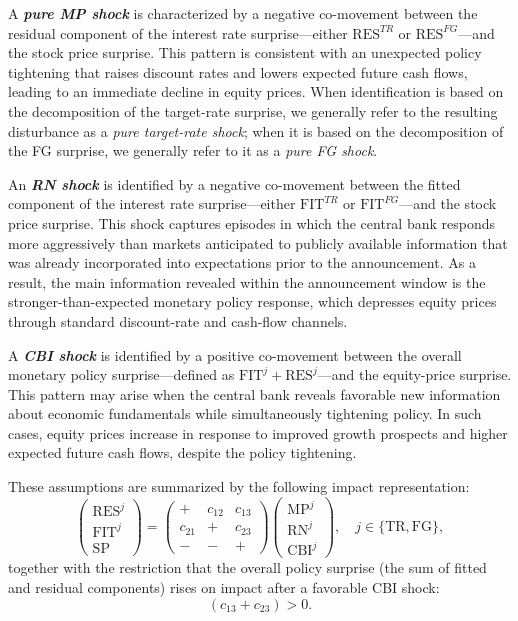 \documentclass[12pt, reqno]{article}
\begin{document}
A \emph{\textbf{pure MP shock}} is characterized by a negative co-movement between the residual component of the interest rate surprise—either $\text{RES}^{TR}$ or $\text{RES}^{FG}$—and the stock price surprise. This pattern is consistent with an unexpected policy tightening that raises discount rates and lowers expected future cash flows, leading to an immediate decline in equity prices. When identification is based on the decomposition of the target-rate surprise, we generally refer to the resulting disturbance as a \emph{pure target-rate shock}; when it is based on the decomposition of the FG surprise, we generally refer to it as a \emph{pure FG shock}.

An \emph{\textbf{RN shock}} is identified by a negative co-movement between the fitted component of the interest rate surprise—either $\text{FIT}^{TR}$ or $\text{FIT}^{FG}$—and the stock price surprise. This shock captures episodes in which the central bank responds more aggressively than markets anticipated to publicly available information that was already incorporated into expectations prior to the announcement. As a result, the main information revealed within the announcement window is the stronger-than-expected monetary policy response, which depresses equity prices through standard discount-rate and cash-flow channels.

A \emph{\textbf{CBI shock}} is identified by a positive co-movement between the overall monetary policy surprise—defined as $\text{FIT}^{j}+\text{RES}^{j}$—and the equity-price surprise. This pattern may arise when the central bank reveals favorable new information about economic fundamentals while simultaneously tightening policy. In such cases, equity prices increase in response to improved growth prospects and higher expected future cash flows, despite the policy tightening.

These assumptions are summarized by the following impact representation:
\begin{equation}
\begin{pmatrix}
\text{RES}^{j} \\
\text{FIT}^{j} \\
\text{SP}
\end{pmatrix}
=
\begin{pmatrix}
+ & c_{12} & c_{13} \\
c_{21} & + & c_{23} \\
- & - & +
\end{pmatrix}
\begin{pmatrix}
\text{MP}^{j} \\
\text{RN}^{j} \\
\text{CBI}^{j}
\end{pmatrix},
\quad j \in \{\text{TR}, \text{FG}\},
\end{equation}
together with the restriction that the overall policy surprise (the sum of fitted and residual components) rises on impact after a favorable CBI shock:
\begin{equation}
\label{eq:cbi_policy_surprise}
(c_{13}+c_{23}) > 0.
\end{equation}
\end{document}
